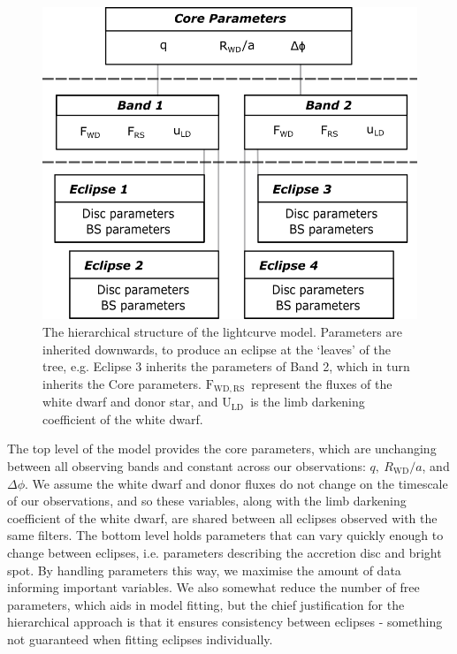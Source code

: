 \begin{figure}
    \centering
    \includegraphics[width=.85\columnwidth ]{figures/results/three_cvs_with_weird_colours/GeneralFigs/hierarchical_model_structure.png}
    \caption{The hierarchical structure of the lightcurve model. Parameters are inherited downwards, to produce an eclipse at the `leaves' of the tree, e.g. Eclipse 3 inherits the parameters of Band 2, which in turn inherits the Core parameters. $\mathrm{F_{WD, RS}}$\ represent the fluxes of the white dwarf and donor star, and $\mathrm{U_{LD}}$\ is the limb darkening coefficient of the white dwarf.}
    \label{fig:modelling:hierarchical_model}
\end{figure}

The top level of the model provides the core parameters, which are unchanging between all observing bands and constant across our observations: $q,\ R_\mathrm{WD}/a$, and $\Delta\phi$. We assume the white dwarf and donor fluxes do not change on the timescale of our observations, and so these variables, along with the limb darkening coefficient of the white dwarf, are shared between all eclipses observed with the same filters. The bottom level holds parameters that can vary quickly enough to change between eclipses, i.e. parameters describing the accretion disc and bright spot. By handling parameters this way, we maximise the amount of data informing important variables. We also somewhat reduce the number of free parameters, which aids in model fitting, but the chief justification for the hierarchical approach is that it ensures consistency between eclipses - something not guaranteed when fitting eclipses individually.

